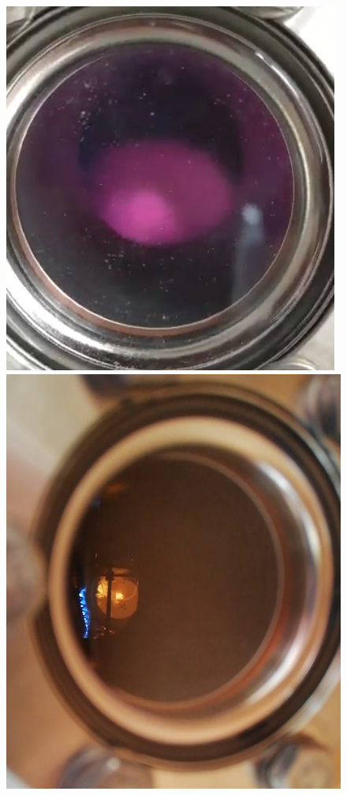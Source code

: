 \begin{figure}[h!]
\centering
\begin{minipage}[c]{200pt}
\includegraphics[width=\textwidth]{Figure/02/fialovy_vyboj.png}
\end{minipage}
\begin{minipage}[c]{200pt}
\includegraphics[width=\textwidth]{Figure/02/jiskra.png}

\end{minipage}
\end{figure}
